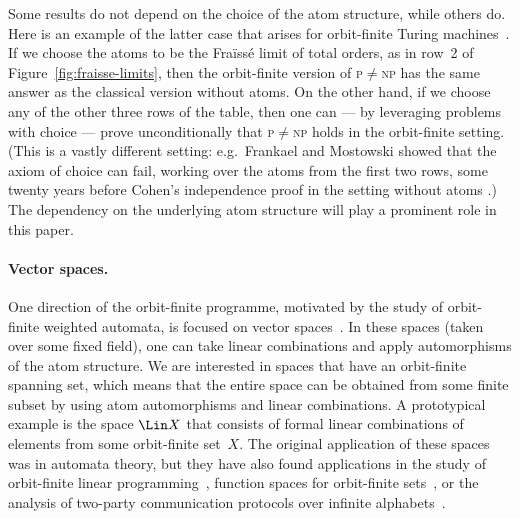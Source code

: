 Some results do not depend on the choice of the atom structure, while others do. 
Here is an example of the latter case that arises for orbit-finite Turing machines~\cite{bojanczykTuringMachinesAtoms2013}. 
If we choose the atoms to be the Fraïssé limit of total orders, as in row~2 of Figure~\ref{fig:fraisse-limits}, then the orbit-finite version of \textsc{p}$\neq$\textsc{np} has the same answer as the classical version without atoms. 
On the other hand, if we choose any of the other three rows of the table, then one can --- by leveraging problems with choice --- prove unconditionally that \textsc{p}$\neq$\textsc{np} holds in the orbit-finite setting. 
(This is a vastly different setting: 
e.g.~Frankael and Mostowski showed that the axiom of choice can fail, working over the atoms from the first two rows, some twenty years before Cohen's independence proof in the setting without atoms \cite[Ch.~4]{Jech}.)
The dependency on the underlying atom structure will play a prominent role in this paper. 


\paragraph*{Vector spaces.}
One direction of the orbit-finite programme, motivated by the study of orbit-finite weighted automata, is focused on vector spaces~\cite{BFKM24}. 
In these spaces (taken over some fixed field), one can take linear combinations and apply automorphisms of the atom structure. 
We are interested in spaces that have an orbit-finite spanning set, which means that the entire space can be obtained from some finite subset by using atom automorphisms and linear combinations.
A prototypical example is the space $\Lin X$ that consists of formal linear combinations of elements from some orbit-finite set~$X$. 
The original application of these spaces was in automata theory, but they have also found applications in the study of  orbit-finite linear programming~\cite{ghosh2023orbit}, function spaces for orbit-finite sets~\cite{functionSpaces2024}, or  the analysis of two-party communication protocols over infinite alphabets~\cite{aliceBob}.

